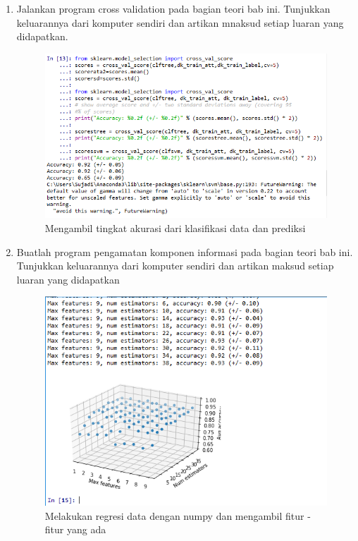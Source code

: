 \begin{enumerate}
    \item Jalankan program cross validation pada bagian teori bab ini. Tunjukkan keluarannya dari komputer sendiri dan artikan mnaksud setiap luaran yang didapatkan.
    
    \begin{figure}[ht]
        \centering
        \includegraphics[scale=0.2]{figures/1174051/4/10.PNG}
        \caption{Mengambil tingkat akurasi dari klasifikasi data dan prediksi}
        \label{contoh11}
    \end{figure}
    \item Buatlah program pengamatan komponen informasi pada bagian teori bab ini. Tunjukkan keluarannya dari komputer sendiri dan artikan maksud setiap luaran yang didapatkan
    
    \begin{figure}[ht]
        \centering
        \includegraphics[scale=0.2]{figures/1174051/4/11.PNG}
        \caption{Melakukan regresi data dengan numpy dan mengambil fitur - fitur yang ada}
        \label{contoh12}
    \end{figure}
\end{enumerate}

